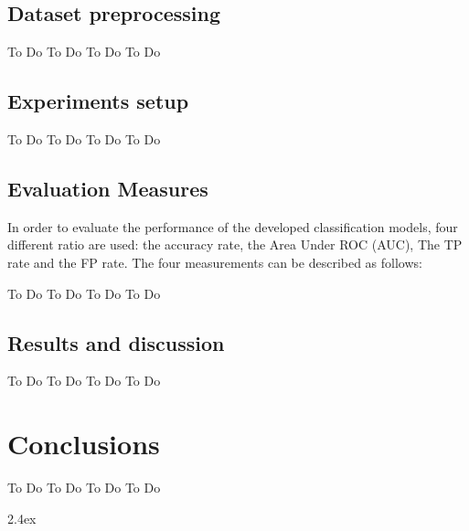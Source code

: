\documentclass[conference]{IEEEtran}
\begin{document}
\subsection{Dataset preprocessing}
 To Do To Do
 To Do To Do
\subsection{Experiments setup}
 To Do To Do
 To Do To Do

\subsection{Evaluation Measures}
 In order to evaluate the performance of the developed classification models, four different ratio are used: the accuracy rate, the Area Under ROC  (AUC), The TP rate and the FP rate. The four measurements can be described as follows:
 
 
 To Do To Do
 To Do To Do
\subsection{Results and discussion}
 To Do To Do
 To Do To Do

%
%
\section{Conclusions}
 To Do To Do
 To Do To Do


\baselineskip 2.4ex 

\end{document}
